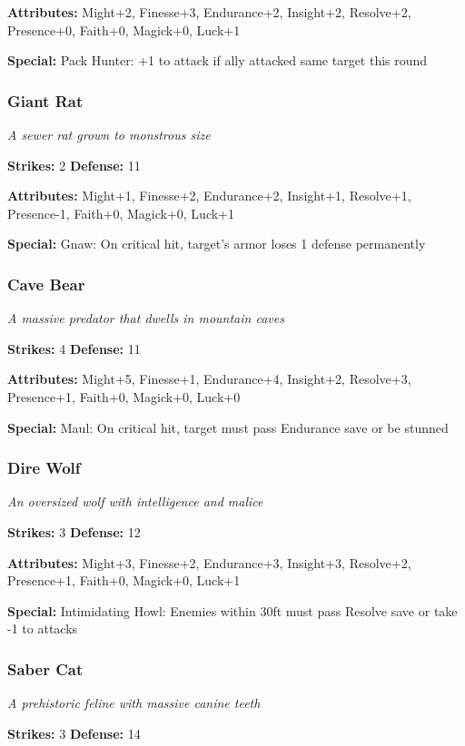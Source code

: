 \documentclass[10pt,twoside]{article}
\begin{document}
\textbf{Attributes:} Might+2, Finesse+3, Endurance+2, Insight+2, Resolve+2, Presence+0, Faith+0, Magick+0, Luck+1

\textbf{Special:} Pack Hunter: +1 to attack if ally attacked same target this round

\subsubsection{Giant Rat}
\textit{A sewer rat grown to monstrous size}

\textbf{Strikes:} 2 \quad \textbf{Defense:} 11

\textbf{Attributes:} Might+1, Finesse+2, Endurance+2, Insight+1, Resolve+1, Presence-1, Faith+0, Magick+0, Luck+1

\textbf{Special:} Gnaw: On critical hit, target's armor loses 1 defense permanently

\subsubsection{Cave Bear}
\textit{A massive predator that dwells in mountain caves}

\textbf{Strikes:} 4 \quad \textbf{Defense:} 11

\textbf{Attributes:} Might+5, Finesse+1, Endurance+4, Insight+2, Resolve+3, Presence+1, Faith+0, Magick+0, Luck+0

\textbf{Special:} Maul: On critical hit, target must pass Endurance save or be stunned

\subsubsection{Dire Wolf}
\textit{An oversized wolf with intelligence and malice}

\textbf{Strikes:} 3 \quad \textbf{Defense:} 12

\textbf{Attributes:} Might+3, Finesse+2, Endurance+3, Insight+3, Resolve+2, Presence+1, Faith+0, Magick+0, Luck+1

\textbf{Special:} Intimidating Howl: Enemies within 30ft must pass Resolve save or take -1 to attacks

\subsubsection{Saber Cat}
\textit{A prehistoric feline with massive canine teeth}

\textbf{Strikes:} 3 \quad \textbf{Defense:} 14
\end{document}
